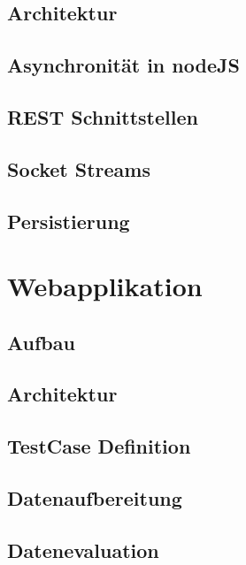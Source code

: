 		\subsection{Architektur}
		\subsection{Asynchronität in nodeJS}
		\subsection{REST Schnittstellen}
		\subsection{Socket Streams}
		\subsection{Persistierung}
	\section{Webapplikation}
		\subsection{Aufbau}
		\subsection{Architektur}
		\subsection{TestCase Definition}
		\subsection{Datenaufbereitung}
		\subsection{Datenevaluation}
